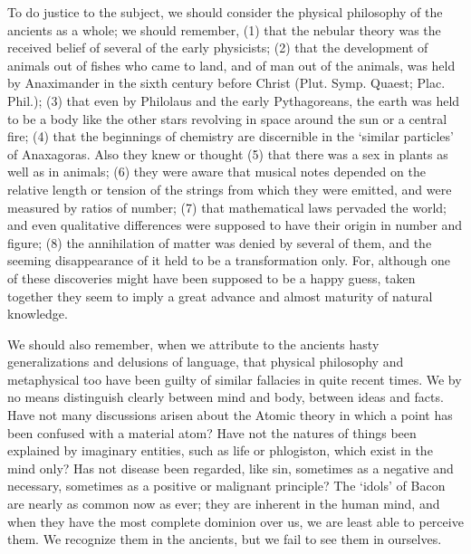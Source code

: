To do justice to the subject, we should consider the physical philosophy
of the ancients as a whole; we should remember, (1) that the nebular
theory was the received belief of several of the early physicists; (2)
that the development of animals out of fishes who came to land, and of man
out of the animals, was held by Anaximander in the sixth century before
Christ (Plut. Symp. Quaest; Plac. Phil.); (3) that even by Philolaus and
the early Pythagoreans, the earth was held to be a body like the other
stars revolving in space around the sun or a central fire; (4) that the
beginnings of chemistry are discernible in the ‘similar particles’ of
Anaxagoras. Also they knew or thought (5) that there was a sex in plants
as well as in animals; (6) they were aware that musical notes depended on
the relative length or tension of the strings from which they were
emitted, and were measured by ratios of number; (7) that mathematical laws
pervaded the world; and even qualitative differences were supposed to have
their origin in number and figure; (8) the annihilation of matter was
denied by several of them, and the seeming disappearance of it held to be
a transformation only. For, although one of these discoveries might have
been supposed to be a happy guess, taken together they seem to imply a
great advance and almost maturity of natural knowledge.

We should also remember, when we attribute to the ancients hasty
generalizations and delusions of language, that physical philosophy and
metaphysical too have been guilty of similar fallacies in quite recent
times. We by no means distinguish clearly between mind and body, between
ideas and facts. Have not many discussions arisen about the Atomic theory
in which a point has been confused with a material atom? Have not the
natures of things been explained by imaginary entities, such as life or
phlogiston, which exist in the mind only? Has not disease been regarded,
like sin, sometimes as a negative and necessary, sometimes as a positive
or malignant principle? The ‘idols’ of Bacon are nearly as common now as
ever; they are inherent in the human mind, and when they have the most
complete dominion over us, we are least able to perceive them. We
recognize them in the ancients, but we fail to see them in ourselves.

